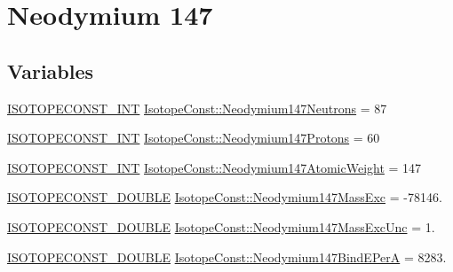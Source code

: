 \hypertarget{group___isotope_const-_neodymium-_nd147}{}\section{Neodymium 147}
\label{group___isotope_const-_neodymium-_nd147}
\subsection*{Variables}
\begin{DoxyCompactItemize}
\item 
\mbox{\hyperlink{group___isotope_const-_macros_ga5f18360b3e99483a35c32d789e62621c}{I\+S\+O\+T\+O\+P\+E\+C\+O\+N\+S\+T\+\_\+\+I\+NT}} \mbox{\hyperlink{group___isotope_const-_neodymium-_nd147_gad95dd738844b9fc04b5e71c8650536bf}{Isotope\+Const\+::\+Neodymium147\+Neutrons}} = 87
\item 
\mbox{\hyperlink{group___isotope_const-_macros_ga5f18360b3e99483a35c32d789e62621c}{I\+S\+O\+T\+O\+P\+E\+C\+O\+N\+S\+T\+\_\+\+I\+NT}} \mbox{\hyperlink{group___isotope_const-_neodymium-_nd147_ga043517e92fbd6bbcb468ee33210711a9}{Isotope\+Const\+::\+Neodymium147\+Protons}} = 60
\item 
\mbox{\hyperlink{group___isotope_const-_macros_ga5f18360b3e99483a35c32d789e62621c}{I\+S\+O\+T\+O\+P\+E\+C\+O\+N\+S\+T\+\_\+\+I\+NT}} \mbox{\hyperlink{group___isotope_const-_neodymium-_nd147_ga97e91c0242c70b636886d1299bbb5397}{Isotope\+Const\+::\+Neodymium147\+Atomic\+Weight}} = 147
\item 
\mbox{\hyperlink{group___isotope_const-_macros_ga8f45a7272ce02c0b4c65c44636ed719a}{I\+S\+O\+T\+O\+P\+E\+C\+O\+N\+S\+T\+\_\+\+D\+O\+U\+B\+LE}} \mbox{\hyperlink{group___isotope_const-_neodymium-_nd147_ga4005e078ab1aa1b10bbb926279dfeaf1}{Isotope\+Const\+::\+Neodymium147\+Mass\+Exc}} = -\/78146.
\item 
\mbox{\hyperlink{group___isotope_const-_macros_ga8f45a7272ce02c0b4c65c44636ed719a}{I\+S\+O\+T\+O\+P\+E\+C\+O\+N\+S\+T\+\_\+\+D\+O\+U\+B\+LE}} \mbox{\hyperlink{group___isotope_const-_neodymium-_nd147_ga84a8f984402d5f96350df51423b66519}{Isotope\+Const\+::\+Neodymium147\+Mass\+Exc\+Unc}} = 1.
\item 
\mbox{\hyperlink{group___isotope_const-_macros_ga8f45a7272ce02c0b4c65c44636ed719a}{I\+S\+O\+T\+O\+P\+E\+C\+O\+N\+S\+T\+\_\+\+D\+O\+U\+B\+LE}} \mbox{\hyperlink{group___isotope_const-_neodymium-_nd147_ga75115b1115ef1a23ee1de409bbab4628}{Isotope\+Const\+::\+Neodymium147\+Bind\+E\+PerA}} = 8283.
\item 

\end{DoxyCompactItemize}
